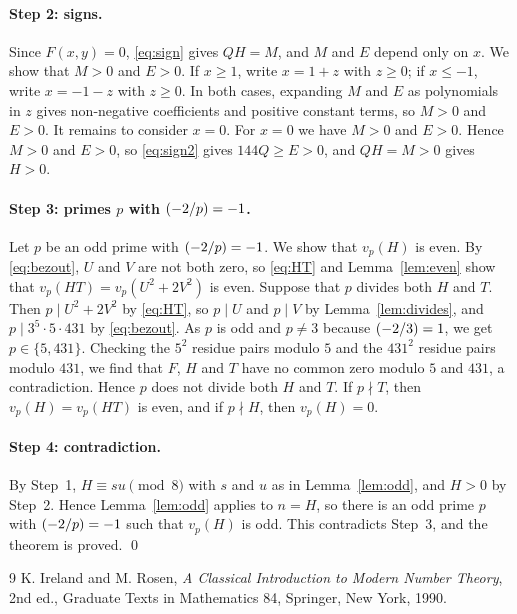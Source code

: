\documentclass[11pt]{article}
\newcommand{\leg}[2]{\mathchoice{\biggl(\dfrac{#1}{#2}\biggr)}{(#1/#2)}{(#1/#2)}{(#1/#2)}}
\begin{document}
\paragraph{Step 2: signs.} Since $F(x,y)=0$, \eqref{eq:sign} gives $QH=M$, and $M$ and $E$ depend only on $x$. We show that $M>0$ and $E>0$. If $x\geq1$, write $x=1+z$ with $z\geq0$; if $x\leq-1$, write $x=-1-z$ with $z\geq0$. In both cases, expanding $M$ and $E$ as polynomials in $z$ gives non-negative coefficients and positive constant terms, so $M>0$ and $E>0$. It remains to consider $x=0$. For $x=0$ we have $M>0$ and $E>0$. Hence $M>0$ and $E>0$, so \eqref{eq:sign2} gives $144Q\geq E>0$, and $QH=M>0$ gives $H>0$.

\paragraph{\texorpdfstring{Step 3: primes $p$ with $\leg{-2}{p}=-1$.}{Step 3: inert primes.}} Let $p$ be an odd prime with $\leg{-2}{p}=-1$. We show that $v_p(H)$ is even. By \eqref{eq:bezout}, $U$ and $V$ are not both zero, so \eqref{eq:HT} and Lemma~\ref{lem:even} show that $v_p(HT)=v_p(U^2+2V^2)$ is even. Suppose that $p$ divides both $H$ and $T$. Then $p\mid U^2+2V^2$ by \eqref{eq:HT}, so $p\mid U$ and $p\mid V$ by Lemma~\ref{lem:divides}, and $p\mid 3^{5}\cdot 5\cdot 431$ by \eqref{eq:bezout}. As $p$ is odd and $p\neq3$ because $\leg{-2}{3}=1$, we get $p\in\{5,431\}$. Checking the $5^2$ residue pairs modulo $5$ and the $431^2$ residue pairs modulo $431$, we find that $F$, $H$ and $T$ have no common zero modulo $5$ and $431$, a contradiction. Hence $p$ does not divide both $H$ and $T$. If $p\nmid T$, then $v_p(H)=v_p(HT)$ is even, and if $p\nmid H$, then $v_p(H)=0$.

\paragraph{Step 4: contradiction.} By Step~1, $H\equiv su\pmod{8}$ with $s$ and $u$ as in Lemma~\ref{lem:odd}, and $H>0$ by Step~2. Hence Lemma~\ref{lem:odd} applies to $n=H$, so there is an odd prime $p$ with $\leg{-2}{p}=-1$ such that $v_p(H)$ is odd. This contradicts Step~3, and the theorem is proved.
\qed

\begin{thebibliography}{9}
 K. Ireland and M. Rosen, \emph{A Classical Introduction to Modern Number Theory}, 2nd ed., Graduate Texts in Mathematics 84, Springer, New York, 1990.
\end{thebibliography}
\end{document}
